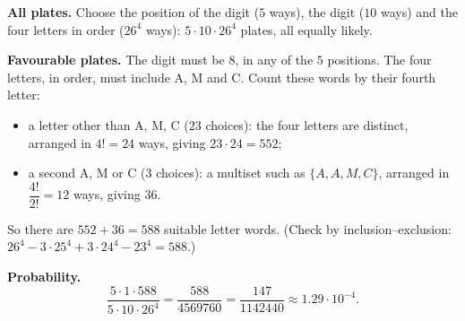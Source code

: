 \textbf{All plates.} Choose the position of the digit ($5$ ways), the digit ($10$ ways) and the four letters in order ($26^4$ ways): $5\cdot10\cdot26^4$ plates, all equally likely.

\textbf{Favourable plates.} The digit must be $8$, in any of the $5$ positions. The four letters, in order, must include A, M and C. Count these words by their fourth letter:
\begin{itemize}
\item a letter other than A, M, C ($23$ choices): the four letters are distinct, arranged in $4!=24$ ways, giving $23\cdot24=552$;
\item a second A, M or C ($3$ choices): a multiset such as $\{A,A,M,C\}$, arranged in $\dfrac{4!}{2!}=12$ ways, giving $36$.
\end{itemize}
So there are $552+36=588$ suitable letter words. (Check by inclusion--exclusion: $26^4-3\cdot25^4+3\cdot24^4-23^4=588$.)

\textbf{Probability.}
\[
\dfrac{5\cdot1\cdot588}{5\cdot10\cdot26^4}=\dfrac{588}{4569760}=\boxed{\dfrac{147}{1142440}}\approx1.29\cdot10^{-4}.
\]
